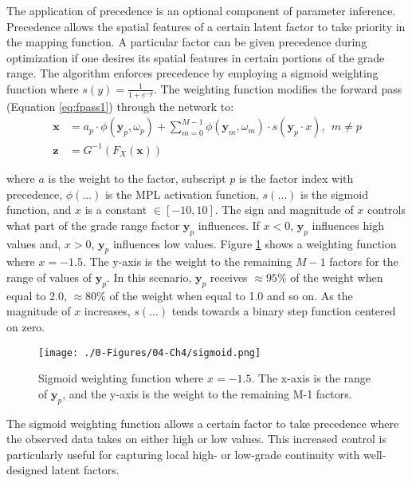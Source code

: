 The application of precedence is an optional component of parameter inference. Precedence allows the spatial features of a certain latent factor to take priority in the mapping function. A particular factor can be given precedence during optimization if one desires its spatial features in certain portions of the grade range. The algorithm enforces precedence by employing a sigmoid weighting function where $s(y) = \frac{1}{1+e^{-y}}$. The weighting function modifies the forward pass (Equation \ref{eq:fpass1}) through the network to:
\begin{align}
    \label{eq:wtpass1}
    \mathbf{x} & = a_{p} \cdot \phi(\mathbf{y}_{p}, \omega_{p}) + \sum_{m=0}^{M-1} \phi(\mathbf{y}_{m}, \omega_{m}) \cdot s(\mathbf{y}_{p} \cdot x), \ \ m \neq p \\
    \label{eq:wtpass2}
    \mathbf{z} & = G^{-1}\left( F_{X}\left(\mathbf{x} \right)\right)
\end{align}

\lowercase{Where} $a$ is the weight to the factor, subscript $p$ is the factor index with precedence, $\phi(\dots)$ is the \gls{MPL} activation function, $s(\dots)$ is the sigmoid function, and $x$ is a constant $\in [-10, 10]$. The sign and magnitude of $x$ controls what part of the grade range factor $\mathbf{y}_{p}$ influences. If $x<0$, $\mathbf{y}_{p}$ influences high values and, $x>0$, $\mathbf{y}_{p}$ influences low values. Figure \ref{fig:sigmoid} shows a weighting function where $x=-1.5$. The y-axis is the weight to the remaining $M-1$ factors for the range of values of $\mathbf{y}_{p}$. In this scenario, $\mathbf{y}_{p}$ receives $\approx 95\%$ of the weight when equal to 2.0, $\approx 80\%$ of the weight when equal to 1.0 and so on. As the magnitude of $x$ increases, $s(\dots)$ tends towards a binary step function centered on zero.

\begin{figure}[htb!]
    \centering
    \texttt{[image: ./0-Figures/04-Ch4/sigmoid.png]}
    \caption{Sigmoid weighting function where $x=-1.5$. The x-axis is the range of $\mathbf{y}_{p}$, and the y-axis is the weight to the remaining M-1 factors. }
    \label{fig:sigmoid}
\end{figure}

The sigmoid weighting function allows a certain factor to take precedence where the observed data takes on either high or low values. This increased control is particularly useful for capturing local high- or low-grade continuity with well-designed latent factors.

